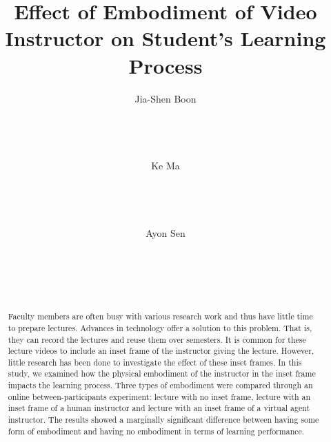 \documentclass{sigchi}
\begin{document}
\title{Effect of Embodiment of Video Instructor on Student's Learning Process}

\author{
  \alignauthor Jia-Shen Boon\\
    \\
    \\
    \\
    \\
  \alignauthor Ke Ma\\
    \\
    \\
    \\
    \\
  \alignauthor Ayon Sen\\
    \\
    \\
    \\
    \\
}

\maketitle

\begin{abstract}
Faculty members are often busy with various research work and thus have little time to prepare lectures. Advances in technology offer a solution to this problem. That is, they can record the lectures and reuse them over semesters. It is common for these lecture videos to include an inset frame of the instructor giving the lecture. However, little research has been done to investigate the effect of these inset frames. In this study, we examined how the physical embodiment of the instructor in the inset frame impacts the learning process. Three types of embodiment were compared through an online between-participants experiment: lecture with no inset frame, lecture with an inset frame of a human instructor and lecture with an inset frame of a virtual agent instructor. The results showed a marginally significant difference between having some form of embodiment and having no embodiment in terms of learning performance.\end{abstract}
\end{document}
